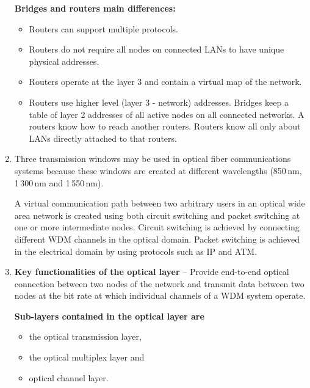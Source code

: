 \documentclass[a4paper, 11pt]{article}
\begin{document}
\begin{enumerate}

			\textbf{Bridges and routers main differences:}
			\begin{itemize}
				\item
					Routers can support multiple protocols.

				\item
					Routers do not require all nodes on connected LANs to have unique physical addresses.

				\item
					Routers operate at the layer 3 and contain a virtual map of the network.

				\item
					Routers use higher level (layer 3 - network) addresses. Bridges keep a table of layer 2 addresses
					of all active nodes on all connected networks. A routers know how to reach another routers.
					Routers know all only about LANs directly attached to that routers.
			\end{itemize}

		\item %
			Three transmission windows may be used in optical fiber communications systems because these windows are
			created at different wavelengths (850\,nm, 1\,300\,nm and 1\,550\,nm).

			A virtual communication path between two arbitrary users in an optical wide area network is created using
			both circuit switching and packet switching at one or more intermediate nodes. Circuit switching is
			achieved by connecting different WDM channels in the optical domain. Packet switching is achieved in the
			electrical domain by using protocols such as IP and ATM.

		\item %
			\textbf{Key functionalities of the optical layer} -- Provide end-to-end optical connection between two
			nodes of the network and transmit data between two nodes at the bit rate at which individual channels
			of a WDM system operate.

			\textbf{Sub-layers contained in the optical layer are}
			\begin{itemize}
				\item the optical transmission layer,
				\item the optical multiplex layer and
				\item optical channel layer.
			\end{itemize}
	\end{enumerate}
\end{document}
